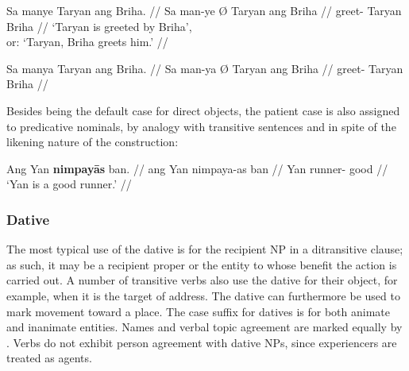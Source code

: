 \pex[aboveglftskip=2em]\label{ex:verbscram}
\a\label{ex:scramcorr}\begingl
	\gla Sa manye {} Taryan ang Briha. //
	\glb Sa man-ye Ø Taryan ang Briha //
	\glc \PatT{} greet-\TsgF{} \Top{} Taryan 
		\Aarg{} Briha //
	\glft `Taryan is greeted by Briha',\\
		or: `Taryan, Briha greets him.' //
\endgl

\a\label{ex:scramfalse}\ljudge* \begingl
	\gla Sa manya {} Taryan ang Briha. //
	\glb Sa man-ya Ø Taryan ang Briha //
	\glc \PatT{} greet-\TsgM{} \Top{} %
		Taryan \Aarg{} Briha //
\endgl\xe
{}

Besides being the default case for direct objects, the patient case is also 
assigned to predicative nominals, by analogy with transitive sentences and in 
spite of the likening nature of the construction:

\ex\begingl
	\gla Ang Yan \textbf{nimpayās} ban. //
	\glb ang Yan nimpaya-as ban //
	\glc \Aarg{} Yan runner-\Parg{} good //
	\glft `Yan is a good runner.' //
\endgl\xe


\subsubsection{Dative}
\label{subsubsec:dative}

The most typical use of the dative is for the recipient NP in a ditransitive
clause; as such, it may be a recipient proper or the entity to whose benefit
the action is carried out. A number of transitive verbs also use the dative for
their object, for example, when it is the target of address. The dative can
furthermore be used to mark movement toward a place. The case suffix for
datives is  for both animate and inanimate entities. Names
and verbal topic agreement are marked equally by . Verbs do not
exhibit person agreement with dative NPs, since experiencers are treated as
agents.

